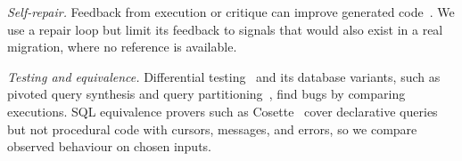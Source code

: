 \textit{Self-repair.} Feedback from execution or critique can improve generated
code~\cite{chen2024selfdebug,shinn2023reflexion,madaan2023selfrefine}. We use a repair loop but limit its
feedback to signals that would also exist in a real migration, where no reference is available.

\textit{Testing and equivalence.} Differential testing~\cite{mckeeman1998} and its database variants, such
as pivoted query synthesis and query partitioning~\cite{rigger2020pqs,rigger2020tlp}, find bugs by
comparing executions. SQL equivalence provers such as Cosette~\cite{chu2017cosette} cover declarative
queries but not procedural code with cursors, messages, and errors, so we compare observed behaviour on
chosen inputs.
